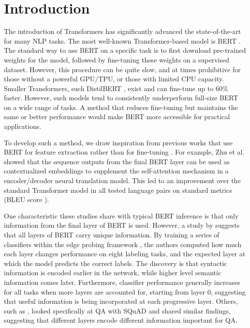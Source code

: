 \section{Introduction}


The introduction of Transformers \cite{Vaswani2017} has significantly advanced the state-of-the-art for many NLP tasks. The most well-known Transformer-based model is BERT \cite{Devlin2019}. The standard way to use BERT on a specific task is to first download pre-trained weights for the model, followed by fine-tuning these weights on a supervised dataset. However, this procedure can be quite slow, and at times prohibitive for those without a powerful GPU/TPU, or those with limited CPU capacity. Smaller Transformers, such DistilBERT \cite{sanh2019distilbert}, exist and can fine-tune up to 60\% faster. However, such models tend to consistently underperform full-size BERT on a wide range of tasks. A method that reduces fine-tuning but maintains the same or better performance would make BERT more accessible for practical applications.

To develop such a method, we draw inspiration from previous works that use BERT for feature extraction rather than for fine-tuning \citep{Zhu2020IncorporatingBI, Chen_2020}. For example, Zhu et al. showed that the sequence outputs from the final BERT layer can be used as contextualized embeddings to supplement the self-attention mechanism in a encoder/decoder neural translation model. This led to an improvement over the standard Transformer model in all tested language pairs on standard metrics (BLEU score \cite{Papineni02bleu:a}).

One characteristic these studies share with typical BERT inference is that only information from the final layer of BERT is used. However, a study by \cite{tenney-etal-2019-bert} suggests that all layers of BERT carry unique information. By training a series of classifiers within the edge probing framework \cite{DBLP:journals/corr/abs-1905-06316}, the authors computed how much each layer changes performance on eight labeling tasks, and the expected layer at which the model predicts the correct labels. The discovery is that syntactic information is encoded earlier in the network, while higher level semantic information comes later. Furthermore, classifier performance generally increases for all tasks when more layers are accounted for, starting from layer 0, suggesting that useful information is being incorporated at each progressive layer. Others, such as \cite{van_Aken_2019}, looked specifically at QA with SQuAD and shared similar findings, suggesting that different layers encode different information important for QA.

